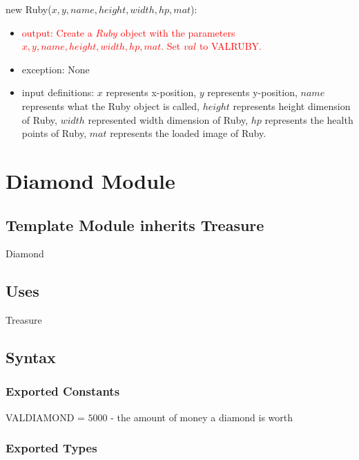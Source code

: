 \documentclass[12pt]{article}
\newcommand{\m}[1]{\mbox{#1}}
\begin{document}
new Ruby($x, y, name, height, width, hp, mat$):
\begin{itemize}
    \item \textcolor{red}{ output: Create a $Ruby$ object with the parameters $x, y, name, height, width, hp, mat$. Set $val$ to VALRUBY.}
    \item exception: None
    \item input definitions: $x$ represents x-position, $y$ represents y-position, $name$ represents what the Ruby object is called, $height$ represents height dimension of Ruby, $width$ represented width dimension of Ruby, $hp$ represents the health points of Ruby, $mat$ represents the loaded image of Ruby.
\end{itemize}

\newpage

\section*{Diamond Module}

\subsection*{Template Module inherits Treasure}

Diamond

\subsection*{Uses}

Treasure

\subsection*{Syntax}

\subsubsection*{Exported Constants}

VALDIAMOND = $5000$ - the amount of money a diamond is worth

\subsubsection*{Exported Types}
\end{document}
